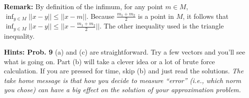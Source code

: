 \documentclass[letterpaper]{article}
\begin{document}
 \textbf{Remark:} By definition of the infimum, for any point $m \in M$, $\inf_{y\in M} ||x-y|| \le ||x-m||$. Because $\frac{m_1+m_2}{2}$ is a point in $M$, it follows that $\inf_{y\in M} ||x-y|| \le || x -\frac{m_1+m_2}{2} ||$. The other inequality used is the triangle inequality.

\vspace{1cm}

\noindent \textbf{Hints: Prob. 9} (a) and (c) are straightforward. Try a few vectors and you'll see what is going on. Part (b) will take a clever idea or a lot of brute force calculation. If you are pressed for time, skip (b) and just read the solutions. \textit{The take home message is that how you decide to measure ``error'' (i.e., which norm you chose) can have a big effect on the solution of your approximation problem.}
\end{document}
